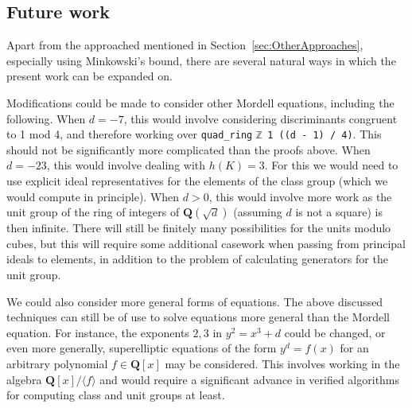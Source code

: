 \documentclass[sigplan,10pt,nonacm,
screen]{acmart} \settopmatter{printfolios=true,printccs=false,printacmref=false}
\newcommand{\ab}[1]{\todo[color=green]{AB: #1}}
\newcommand{\QQ}{\mathbf{Q}}
\newcommand{\ZZ}{\mathbf{Z}}
\begin{document}
\subsection{Future work}\label{sec:Future}

Apart from the approached mentioned in Section~\ref{sec:OtherApproaches}, especially using Minkowski's bound, there are several natural ways in which the present work can be expanded on.

Modifications could be made to consider other Mordell equations, including the following.
%
%
When $d = -7$, this would involve considering discriminants congruent to 1 mod 4, and therefore working over \lstinline{quad_ring} %
\lstinline{ℤ 1 ((d - 1) / 4)}. This should not be significantly more complicated than the proofs above. %
%
When $d=-23$, this would involve dealing with $h(K)=3$. For this we would need to use explicit ideal representatives for the elements of the class group (which we would compute in principle).
%
%
When $d > 0$, this would involve more work as the unit group of the ring of integers of $\QQ(\sqrt{d})$ (assuming $d$ is not a square) is then infinite. %
There will still be finitely many possibilities for the units modulo cubes, but this will require some additional casework when passing from principal ideals to elements, in addition to the problem of calculating generators for the unit group.

We could also consider more general forms of equations.
The above discussed techniques can still be of use to solve equations more general than the Mordell equation.
For instance, the exponents $2,3$ in $y^2 = x^3 +d$ could be changed, or even more generally, superelliptic equations of the form $y^d = f(x)$ for an arbitrary polynomial $f \in \QQ[x]$ may be considered.
This involves working in the algebra $\QQ[x]/\langle f\rangle$ and would require a significant advance in verified algorithms for computing class and unit groups at least.
\end{document}
